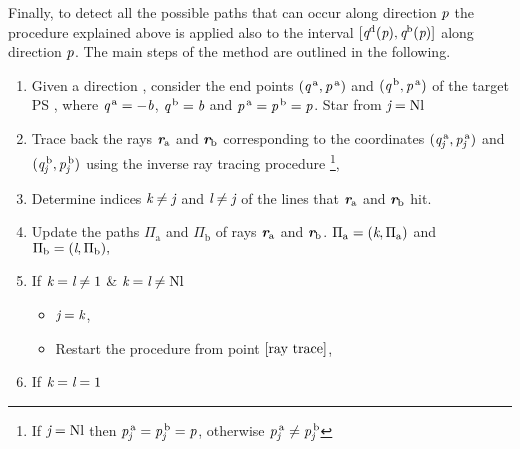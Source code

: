 Finally, to detect all the possible paths that can occur along direction $\textit{p}$ the procedure explained above is applied also to the interval $[\textit{q}^{\textrm{d}}(\textit{p}), \textit{q}^{\textrm{b}}(\textit{p})]$ along direction $\textit{p}$. 
The main steps of the method are outlined in the following.
\begin{enumerate}
\item Given a direction , consider the end points $(\textit{q}^{\,\textrm{a}}, \textit{p}^{\,\textrm{a}})$ and $(\textit{q}^{\,\textrm{b}}, \textit{p}^{\,\textrm{a}})$ of the target PS , where $\textit{q}^{\,\textrm{a}} = -\textit{b}$, $\textit{q}^{\,\textrm{b}} = \textit{b}$ and $\textit{p}^{\,\textrm{a}} = \textit{p}^{\,\textrm{b}} = \textit{p}$. Star from $\textit{j}=\textrm{Nl}$
\item \label{ray trace} Trace back the rays $\textit{\textbf{r}}_{\textrm{a}}$ and $\textit{\textbf{r}}_\textrm{b}$ corresponding to the coordinates  $(\textit{q}_{\textit{j}}^{\,\textrm{a}}, \textit{p}_{\textit{j}}^{\,\textrm{a}})$ and $ (\textit{q}_{\textit{j}}^{\,\textrm{b}}, \textit{p}_{\textit{j}}^{\,\textrm{b}})$ using the inverse ray tracing procedure
\footnote{If $\textit{j}=\textrm{Nl} $ then $\textit{p}_{\textit{j}}^{\,\textrm{a}}=\textit{p}_{\textit{j}}^{\,\textrm{b}}=\textit{p}$, otherwise $\textit{p}_{\textit{j}}^{\,\textrm{a}}\neq\textit{p}_{\textit{j}}^{\,\textrm{b}}$},
\item Determine indices $\textit{k}\neq\textit{j}$ and $\textit{l}\neq\textit{j}$ of the lines that  $\textit{\textbf{r}}_{\textrm{a}}$ and $\textit{\textbf{r}}_{\textrm{b}}$  hit.\\
\item Update the paths $\Pi_\textrm{a}$ and $\Pi_\textrm{b}$ of rays $\textit{\textbf{r}}_\textrm{a}$ and $\textit{\textbf{r}}_\textrm{b}$.  $\Pi_\textrm{a} = (\textit{k}, \Pi_{\textrm{a}})$ and $\Pi_\textrm{b} = (\textit{l}, \Pi_\textrm{b}),$
\item If $\textit{k}=\textit{l} \neq 1$ \& $\textit{k}=\textit{l} \neq \textrm{Nl}$
\begin{itemize}
\item $\textit{j}=\textit{k}$,
\item Restart the procedure from point $\ref{ray trace}$, 
\end{itemize}
\item If $\textit{k}=\textit{l}= 1$ 
\begin{itemize}

\end{itemize}
\end{enumerate}
